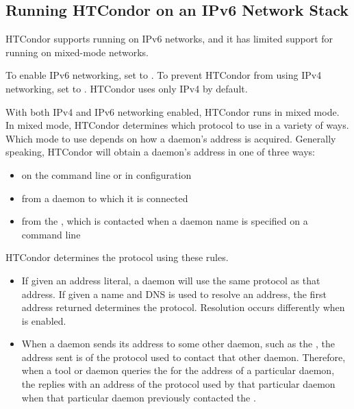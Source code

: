 \subsection{\label{sec:ipv6}Running HTCondor on an IPv6 Network Stack}

HTCondor supports running on IPv6 networks, and it has limited support for
running on mixed-mode networks.

To enable IPv6 networking, set  to .  To
prevent HTCondor from using IPv4 networking, set  to
.  HTCondor uses only IPv4 by default.

With both IPv4 and IPv6 networking enabled, 
HTCondor runs in mixed mode.  
In mixed mode, HTCondor determines which protocol to use in a
variety of ways. 
Which mode to use depends on how a daemon's address is acquired.
Generally speaking, HTCondor will obtain a daemon's
address in one of three ways:

\begin{itemize}
\item{on the command line or in configuration}
\item{from a daemon to which it is connected}
\item{from the , which is contacted when a daemon
name is specified on a command line}
\end{itemize}

HTCondor determines the protocol using these rules.

\begin{itemize}
\item{If given an address literal, a daemon will use the same protocol as
that address.
If given a name and DNS is used to resolve an address, 
the first address returned determines the protocol.
Resolution occurs differently when  is enabled.  }
\item{When a daemon sends its address to some other daemon, such as
the , the address sent is of the protocol used to
contact that other daemon.  Therefore, when a tool or daemon queries
the  for the address of a particular daemon, the
 replies with an address of the protocol used by
that particular daemon when that particular daemon previously
contacted the .}
\end{itemize}

